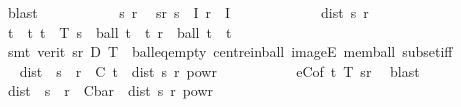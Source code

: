 \begin{isabellebody}
\ blast\isanewline
\ \ \isamarkupfalse%
\isanewline
\ \ \isacommand{{\isacharbraceleft}{\kern0pt}}\isamarkupfalse%
\isanewline
\ \ \ \ \isamarkupfalse%
\ s\ r\ \isamarkupfalse%
\ sr{\isacharcolon}{\kern0pt}\ {\isachardoublequoteopen}s\ {\isasymin}\ I{\isachardoublequoteclose}\ {\isachardoublequoteopen}r\ {\isasymin}\ I{\isachardoublequoteclose}\isanewline
\ \ \ \ \isacommand{{\isacharbraceleft}{\kern0pt}}\isamarkupfalse%
\isanewline
\ \ \ \ \ \ \isamarkupfalse%
\ {\isachardoublequoteopen}dist\ s\ r\ {\isacharless}{\kern0pt}\ {\isasymrho}{\isachardoublequoteclose}\isanewline
\ \ \ \ \ \ \isamarkupfalse%
\ \isamarkupfalse%
\ t\ \ t{\isacharcolon}{\kern0pt}\ {\isachardoublequoteopen}t\ {\isasymin}\ T{\isachardoublequoteclose}\ {\isachardoublequoteopen}s\ {\isasymin}\ ball\ t\ {\isacharparenleft}{\kern0pt}{\isasymepsilon}\ t{\isacharparenright}{\kern0pt}{\isachardoublequoteclose}\ {\isachardoublequoteopen}r\ {\isasymin}\ ball\ t\ {\isacharparenleft}{\kern0pt}{\isasymepsilon}\ t{\isacharparenright}{\kern0pt}{\isachardoublequoteclose}\isanewline
\ \ \ \ \ \ \ \ \isamarkupfalse%
\ {\isacharparenleft}{\kern0pt}smt\ {\isacharparenleft}{\kern0pt}verit{\isacharparenright}{\kern0pt}\ sr\ D\ T\ {\isasymrho}\ ball{\isacharunderscore}{\kern0pt}eq{\isacharunderscore}{\kern0pt}empty\ centre{\isacharunderscore}{\kern0pt}in{\isacharunderscore}{\kern0pt}ball\ imageE\ mem{\isacharunderscore}{\kern0pt}ball\ subset{\isacharunderscore}{\kern0pt}iff{\isacharparenright}{\kern0pt}\isanewline
\ \ \ \ \ \ \isamarkupfalse%
\ \isamarkupfalse%
\ {\isachardoublequoteopen}dist\ {\isacharparenleft}{\kern0pt}{\isasymphi}\ s{\isacharparenright}{\kern0pt}\ {\isacharparenleft}{\kern0pt}{\isasymphi}\ r{\isacharparenright}{\kern0pt}\ {\isasymle}\ C\ t\ {\isacharasterisk}{\kern0pt}\ dist\ s\ r\ powr\ {\isasymgamma}{\isachardoublequoteclose}\isanewline
\ \ \ \ \ \ \ \ \isamarkupfalse%
\ eC{\isacharbrackleft}{\kern0pt}of\ t{\isacharbrackright}{\kern0pt}\ T{\isacharparenleft}{\kern0pt}{}{\isacharparenright}{\kern0pt}\ sr\ \isamarkupfalse%
\ blast\isanewline
\ \ \ \ \ \ \isamarkupfalse%
\ \isamarkupfalse%
\ {\isachardoublequoteopen}dist\ {\isacharparenleft}{\kern0pt}{\isasymphi}\ s{\isacharparenright}{\kern0pt}\ {\isacharparenleft}{\kern0pt}{\isasymphi}\ r{\isacharparenright}{\kern0pt}\ {\isasymle}\ C{\isacharunderscore}{\kern0pt}bar\ {\isacharasterisk}{\kern0pt}\ dist\ s\ r\ powr\ {\isasymgamma}{\isachardoublequoteclose}\isanewline

\end{isabellebody}
